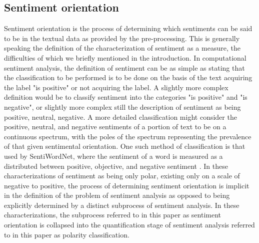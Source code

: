 \documentclass[letterpaper, 10 pt, conference]{ieeeconf}
\begin{document}
\subsection{Sentiment orientation} Sentiment orientation is the process of determining which sentiments can be said to be in the textual data as provided by the pre-processing. This is generally speaking the definition of the characterization of sentiment as a measure, the difficulties of which we briefly mentioned in the introduction. In computational sentiment analysis, the definition of sentiment can be as simple as stating that the classification to be performed is to be done on the basis of the text acquiring the label "is positive" or not acquiring the label. A slightly more complex definition would be to classify sentiment into the categories "is positive" and "is negative", or slightly more complex still the description of sentiment as being positive, neutral, negative. A more detailed classification might consider the positive, neutral, and negative sentiments of a portion of text to be on a continuous spectrum, with the poles of the spectrum representing the prevalence of that given sentimental orientation. One such method of classification is that used by SentiWordNet, where the sentiment of a word is measured as a distributed between positive, objective, and negative sentiment \textcolor{gray}{\cite{Esuli,Baccianella}}. In these characterizations of sentiment as being only polar, existing only on a scale of negative to positive, the process of determining sentiment orientation is implicit in the definition of the problem of sentiment analysis as opposed to being explicitly determined by a distinct subprocess of sentiment analysis. In these characterizations, the subprocess referred to in this paper as sentiment orientation is collapsed into the quantification stage of sentiment analysis referred to in this paper as polarity classification.
\end{document}
